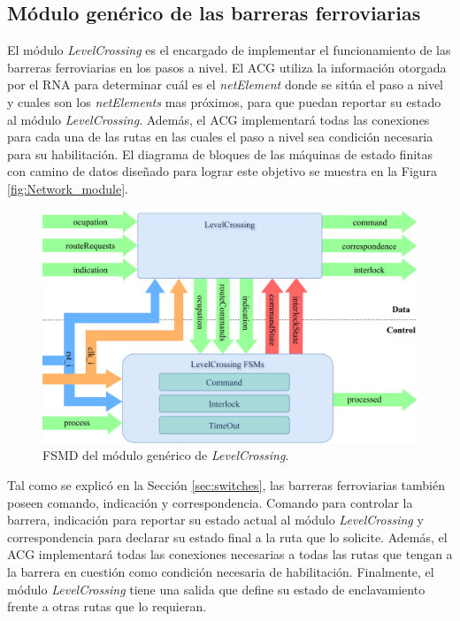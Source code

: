 \subsection{Módulo genérico de las barreras ferroviarias}

El módulo \textit{LevelCrossing} es el encargado de implementar el funcionamiento de las barreras ferroviarias en los pasos a nivel. El ACG utiliza la información otorgada por el RNA para determinar cuál es el \textit{netElement} donde se sitúa el paso a nivel y cuales son los \textit{netElements} mas próximos, para que puedan reportar su estado al módulo \textit{LevelCrossing}. Además, el ACG implementará todas las conexiones para cada una de las rutas en las cuales el paso a nivel sea condición necesaria para su habilitación. El diagrama de bloques de las máquinas de estado finitas con camino de datos diseñado para lograr este objetivo se muestra en la Figura \ref{fig:Network_module}.

\begin{figure}[H]
	\centering
	\includegraphics[width=1\textwidth]{Figuras/LCB_module}
	\centering\caption{FSMD del módulo genérico de \textit{LevelCrossing}.}
	\label{fig:LCB_module}
\end{figure}

Tal como se explicó en la Sección \ref{sec:switches}, las barreras ferroviarias también poseen comando, indicación y correspondencia. Comando para controlar la barrera, indicación para reportar su estado actual al módulo \textit{LevelCrossing} y correspondencia para declarar su estado final a la ruta que lo solicite. Además, el ACG implementará todas las conexiones necesarias a todas las rutas que tengan a la barrera en cuestión como condición necesaria de habilitación. Finalmente, el módulo \textit{LevelCrossing} tiene una salida que define su estado de enclavamiento frente a otras rutas que lo requieran.

